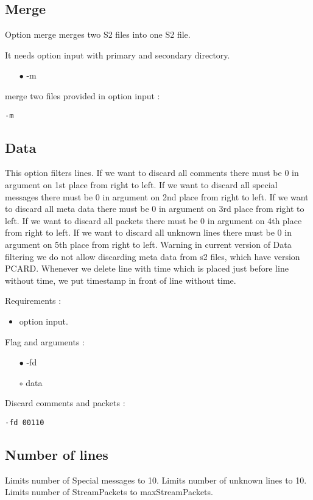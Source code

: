 \documentclass[english]{article}
\begin{document}
\subsection{Merge}
Option merge merges two S2 files into one S2 file. 

It needs option input with primary and secondary directory.
\begin{itemize}
 \item[$\bullet$] -m
 \end{itemize}
merge two files provided in option input : \begin{lstlisting} 
-m
\end{lstlisting}


\subsection{Data}
This option filters lines. If we want to discard all comments there must be 0 in argument on 1st place from right to left. If we want to discard all special messages there must be 0 in argument on 2nd place from right to left. If we want to discard all meta data there must be 0 in argument on 3rd place from right to left. If we want to discard all packets there must be 0 in argument on 4th place from right to left. If we want to discard all unknown lines there must be 0 in argument on 5th place from right to left. Warning in current version of Data filtering we do not allow discarding meta data from s2 files, which have version PCARD. Whenever we delete line with time which is placed just before line without time, we put timestamp in front of line without time.

\noindent Requirements : 
\begin{itemize}
\item option input. 
\end{itemize}
Flag and arguments :
\begin{itemize}
\item[$\bullet$] -fd
\item[$\circ$] data
\end{itemize}
Discard comments and packets : 
\begin{lstlisting} 
-fd 00110
\end{lstlisting}


\subsection{Number of lines}
Limits number of Special messages to 10. Limits number of unknown lines to 10. Limits number of StreamPackets to maxStreamPackets.
\end{document}
